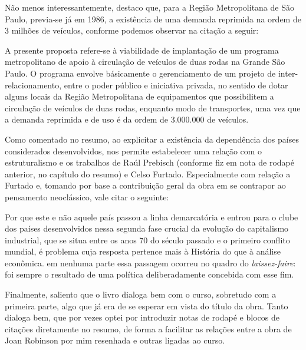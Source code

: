	Não menos interessantemente, destaco que, para a Região Metropolitana de São Paulo, previa-se já em 1986, a existência de uma demanda reprimida na ordem de 3 milhões de veículos, conforme podemos observar na citação a seguir:
	
	\begin{citacao}
		A presente proposta refere-se à viabilidade de implantação de um programa metropolitano de apoio à circulação de veículos de duas rodas na Grande São Paulo. O programa envolve básicamente o gerenciamento de um projeto de inter-relacionamento, entre o poder público e iniciativa privada, no sentido de dotar alguns locais da Região Metropolitana de equipamentos que possibilitem a circulação de veículos de duas rodas, enquanto modo de transportes, uma vez que a demanda reprimida e de uso é da ordem de 3.000.000 de veículos.
		\cite[pág. 4]{Prociclo1986}
	\end{citacao}
	
	Como comentado no resumo, ao explicitar a existência da dependência dos países considerados desenvolvidos,  nos permite estabelecer uma relação com o estruturalismo e os trabalhos de Raúl Prebisch (conforme fiz em nota de rodapé anterior, no capítulo do resumo) e Celso Furtado. Especialmente com relação a Furtado e, tomando por base a contribuição geral da obra em se contrapor ao pensamento neoclássico, vale citar o seguinte:
	
	\begin{citacao}
		Por que este e não aquele país passou a linha demarcatória e entrou para o clube dos países desenvolvidos nessa segunda fase crucial da evolução do capitalismo industrial, que se situa entre os anos 70 do século passado e o primeiro conflito mundial, é problema cuja resposta pertence mais à História do que à análise econômica. em nenhuma parte essa passagem ocorreu no quadro do \textit{laissez-faire}: foi sempre o resultado de uma política deliberadamente concebida com esse fim.
		\cite[pág. 20]{Furtado1974}
	\end{citacao}

	Finalmente, saliento que o livro dialoga bem com o curso, sobretudo com a primeira parte, algo que já era de se esperar em vista do título da obra. Tanto dialoga bem, que por vezes optei por introduzir notas de rodapé e blocos de citações diretamente no resumo, de forma a facilitar as relações entre a obra de Joan Robinson por mim resenhada e outras ligadas ao curso.
	
	\postextual
	
